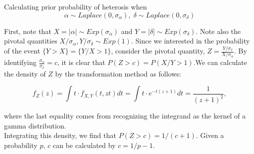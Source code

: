 \documentclass{article}
\begin{document}
\doublespace

Calculating prior probability of heterosis when
\[\alpha \sim Laplace(0,\sigma_\alpha),\; \delta \sim Laplace(0,\sigma_\delta)\]

First, note that $X = |\alpha| \sim Exp(\sigma_\alpha)$ and $Y = |\delta| \sim Exp(\sigma_\delta)$. Note also the pivotal quantities $X/\sigma_{\alpha}, Y/\sigma_{\delta} \sim Exp(1)$. Since we interested in the probability of the event $\{Y > X\} = \{Y/X>1\}$, consider the pivotal quantity, $Z = \frac{Y/\sigma_\delta}{X/\sigma_\alpha}$. By identifying $\frac{\sigma_\alpha}{\sigma_\delta} = c$, it is clear that $P(Z>c) = P(X/Y > 1)$.We can calculate the density of $Z$ by the transformation method as follows:

\[f_Z(z) = \int t\cdot f_{X,Y}(t,zt) dt = \int  t\cdot e^{-t(z+1)} dt = \frac{1}{(z+1)^2},\]

where the last equality comes from recognizing the integrand as the kernel of a gamma distribution.\\

Integrating this density, we find that $P(Z>c) = 1/(c+1)$. Given a probability $p$, $c$ can be calculated by $c = 1/p - 1$.\\
\end{document}
